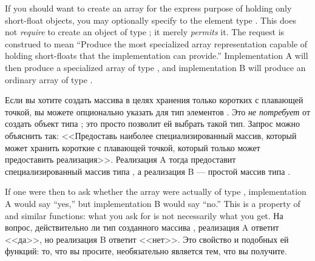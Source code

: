 If you should want to create an array for the
express purpose of holding only short-float objects, you may
optionally specify to  the element type
.  This does not {\it require}  to create
an object of type ; it merely {\it permits} it.  The
request is construed to mean ``Produce the most specialized array
representation capable of holding short-floats that the implementation
can provide.''  Implementation A will then produce a specialized
array of type , and implementation B
will produce an ordinary array of type .

Если вы хотите создать массива в целях хранения только коротких с плавающей
точкой, вы можете опционально указать для  тип элементов
. Это {\it не потребует} от  создать объект типа
; это просто позволит ей выбрать такой тип. Запрос
можно объяснить так: <<Предоставь наиболее специализированный массив, который
может хранить короткие с плавающей точкой, который только может предоставить
реализация>>. Реализация A тогда предоставит специализированный массив типа
, а реализация B --- простой массив типа .

If one were then to ask whether the array were actually of type
, implementation A would say ``yes,'' but
implementation B would say ``no.''  This is a property of 
and similar functions: what you ask for is not necessarily what you get. 
На вопрос, действительно ли тип созданного массива ,
реализация A ответит <<да>>, но реализация B ответит <<нет>>. Это свойство
 и подобных ей функций: то, что вы просите, необязательно
является тем, что вы получите.


